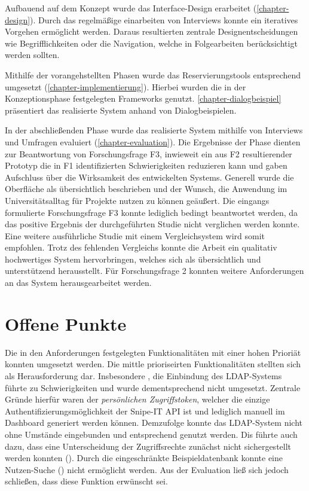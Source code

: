 Aufbauend auf dem Konzept wurde das Interface-Design erarbeitet (\ref{chapter-design}). Durch das
regelmäßige einarbeiten von Interviews konnte ein iteratives Vorgehen ermöglicht werden. Daraus
resultierten zentrale Designentscheidungen wie Begrifflichkeiten oder die Navigation, welche in
Folgearbeiten berücksichtigt werden sollten. 

Mithilfe der vorangehstellten Phasen wurde das Reservierungstools entsprechend umgesetzt
(\ref{chapter-implementierung}). Hierbei wurden die in der Konzeptionsphase festgelegten Frameworks
genutzt. \ref{chapter-dialogbeispiel} präsentiert das realisierte System anhand von
Dialogbeispielen.

In der abschließenden Phase wurde das realisierte System mithilfe von Interviews und Umfragen
evaluiert (\ref{chapter-evaluation}). Die Ergebnisse der Phase dienten zur Beantwortung von
Forschungsfrage F3, inwieweit ein aus F2 resultierender Prototyp die in F1 identifizierten
Schwierigkeiten reduzieren kann und gaben Aufschluss über die Wirksamkeit des entwickelten Systems.
Generell wurde die Oberfläche als übersichtlich beschrieben und der Wunsch, die Anwendung im
Universitätsalltag für Projekte nutzen zu können geäußert. Die eingangs formulierte Forschungsfrage
F3 konnte lediglich bedingt beantwortet werden, da das positive Ergebnis der durchgeführten Studie
nicht verglichen werden konnte. Eine weitere ausführliche Studie mit einem Vergleichsystem wird
somit empfohlen. Trotz des fehlenden Vergleichs konnte die Arbeit ein qualitativ hochwertiges System
hervorbringen, welches sich als übersichtlich und unterstützend herausstellt. Für Forschungsfrage 2
konnten weitere Anforderungen an das System herausgearbeitet werden. 

\section{Offene Punkte}
\label{sec:punkte}
Die in den Anforderungen festgelegten Funktionalitäten mit einer hohen Prioriät konnten umgesetzt
werden. Die mittle prioriseirten Funktionalitäten stellten sich als Herausforderung dar.
Insbesondere , die Einbindung des LDAP-Systems führte zu Schwierigkeiten und wurde
dementsprechend nicht umgesetzt. Zentrale Gründe hierfür waren der \textit{persönlichen
Zugriffstoken}, welcher die einzige Authentifizierungsmöglichkeit der Snipe-IT API ist und lediglich
manuell im Dashboard generiert werden können. Demzufolge konnte das LDAP-System nicht ohne Umstände
eingebunden und entsprechend genutzt werden. Dis führte auch dazu, dass eine Unterscheidung der
Zugriffsrechte zunächst nicht sichergestellt werden konnten (). Durch die eingeschränkte
Beispieldatenbank konnte eine Nutzen-Suche () nicht ermöglicht werden. Aus der
Evaluation ließ sich jedoch schließen, dass diese Funktion erwünscht sei.

